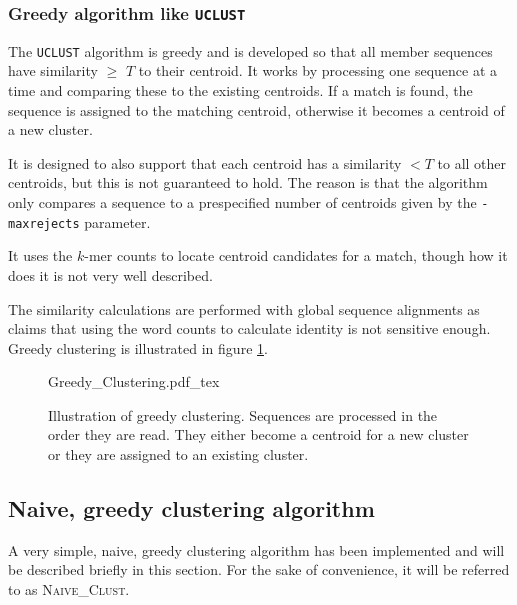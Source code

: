 \subsubsection{Greedy algorithm like \texttt{UCLUST}}
The \texttt{UCLUST} algorithm is greedy and is developed so that all member
sequences have similarity $\geq$ $T$ to their centroid.  It works by processing
one sequence at a time and comparing these to the existing centroids. If a
match is found, the sequence is assigned to the matching centroid, otherwise it
becomes a centroid of a new cluster.

It is designed to also support that each centroid has a similarity $<T$ to all
other centroids, but this is not guaranteed to hold. The reason is that the
algorithm only compares a sequence to a prespecified number of centroids given
by the \texttt{-maxrejects} parameter.

It uses the $k$-mer counts to locate centroid candidates for a match, though
how it does it is not very well described.

The similarity calculations are performed with global sequence alignments as
\cite{usearch} claims that using the word counts to calculate identity is not
sensitive enough. Greedy clustering is illustrated in figure \ref{fig:greedy_clustering}.

\begin{figure}[h!]
  \def\svgwidth{\columnwidth}
  {Greedy_Clustering.pdf_tex}
  \caption{Illustration of greedy clustering. Sequences are processed in the order they are read. They either become a centroid for a new cluster or they are assigned to an existing cluster.}
  \label{fig:greedy_clustering}
\end{figure}







\subsection{Naive, greedy clustering algorithm}

A very simple, naive, greedy clustering algorithm has been implemented and will
be described briefly in this section. For the sake of convenience, it will be
referred to as \textsc{Naive\_Clust}.

